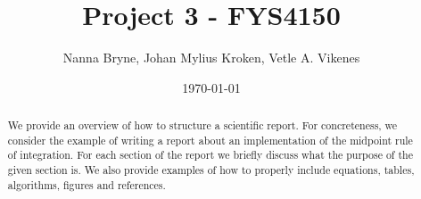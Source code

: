 



\title{Project 3 - FYS4150} 
\author{Nanna Bryne, Johan Mylius Kroken, Vetle A. Vikenes} 
\date{\today}                             
\noaffiliation                            

\begin{abstract}
    We provide an overview of how to structure a scientific report. For concreteness, we consider the example of writing a report about an implementation of the midpoint rule of integration. For each section of the report we briefly discuss what the purpose of the given section is. We also provide examples of how to properly include equations, tables, algorithms, figures and references.
\end{abstract}
\maketitle












\onecolumngrid

%




